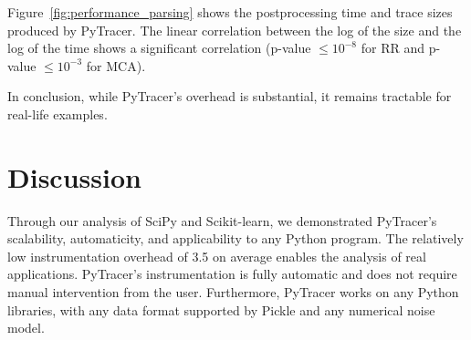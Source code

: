 \documentclass[11pt]{article}
\newcommand{\tristan}[1]{\color{orange}\textbf{From Tristan:} #1\color{black}\xspace}
\newcommand{\pytracer}[0]{PyTracer\xspace}
\begin{document}

Figure~\ref{fig:performance_parsing} shows
the postprocessing time and trace sizes produced by \pytracer. 
The linear correlation between the log of the size and the log of the time shows a significant correlation 
(p-value $\leq 10^{-8}$ for RR and p-value $\leq 10^{-3}$ for MCA).

In conclusion, while \pytracer's overhead is substantial, it remains tractable for real-life examples.

\section{Discussion}



Through our analysis of SciPy and Scikit-learn, we demonstrated \pytracer's scalability, automaticity, and applicability to any Python program. The relatively low instrumentation overhead of 3.5 on average enables the analysis of real applications. \pytracer's instrumentation is fully automatic and does not require manual intervention from the user. Furthermore, \pytracer works on any Python libraries, with any data format supported by Pickle and any numerical noise model.
\end{document}
